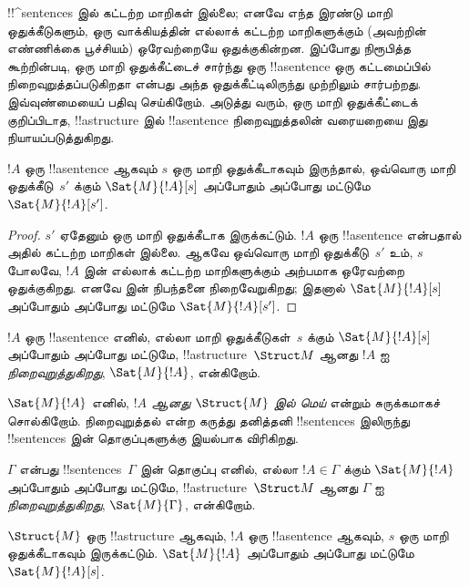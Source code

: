 \documentclass[../../../include/open-logic-section]{subfiles}
\begin{document}
\begin{explain}
!!^{sentence}s இல் கட்டற்ற மாறிகள் இல்லை; எனவே எந்த இரண்டு மாறி
ஒதுக்கீடுகளும், ஒரு வாக்கியத்தின் எல்லாக் கட்டற்ற மாறிகளுக்கும்
(அவற்றின் எண்ணிக்கை பூச்சியம்) ஒரேவற்றையே ஒதுக்குகின்றன.
இப்போது நிரூபித்த கூற்றின்படி, ஒரு மாறி ஒதுக்கீட்டைச் சார்ந்து ஒரு
!!a{sentence} ஒரு கட்டமைப்பில் நிறைவுறுத்தப்படுகிறதா என்பது அந்த
ஒதுக்கீட்டிலிருந்து முற்றிலும் சார்பற்றது. இவ்வுண்மையைப் பதிவு
செய்கிறோம். அடுத்து வரும், ஒரு மாறி ஒதுக்கீட்டைக் குறிப்பிடாத,
!!a{structure} இல் !!a{sentence} நிறைவுறுத்தலின் வரையறையை இது
நியாயப்படுத்துகிறது.
\end{explain}

\begin{cor}
$!A$ ஒரு !!a{sentence} ஆகவும் $s$ ஒரு மாறி ஒதுக்கீடாகவும் இருந்தால்,
ஒவ்வொரு மாறி ஒதுக்கீடு~$s'$ க்கும் $\Sat{M}{!A}[s]$ அப்போதும் அப்போது மட்டுமே
$\Sat{M}{!A}[s']$.
\end{cor}

\begin{proof}
  $s'$ ஏதேனும் ஒரு மாறி ஒதுக்கீடாக இருக்கட்டும். $!A$ ஒரு
  !!a{sentence} என்பதால் அதில் கட்டற்ற மாறிகள் இல்லை. ஆகவே ஒவ்வொரு
  மாறி ஒதுக்கீடு~$s'$ உம், $s$ போலவே, $!A$ இன் எல்லாக் கட்டற்ற
  மாறிகளுக்கும் அற்பமாக ஒரேவற்றை ஒதுக்குகிறது. எனவே
   இன் நிபந்தனை நிறைவேறுகிறது; இதனால்
  $\Sat{M}{!A}[s]$ அப்போதும் அப்போது மட்டுமே $\Sat{M}{!A}[s']$.
\end{proof}

\begin{defn}
$!A$ ஒரு !!a{sentence} எனில், எல்லா மாறி ஒதுக்கீடுகள்~$s$ க்கும்
$\Sat{M}{!A}[s]$ அப்போதும் அப்போது மட்டுமே, !!a{structure}~$\Struct M$ ஆனது $!A$ ஐ
\emph{நிறைவுறுத்துகிறது}, $\Sat{M}{!A}$, என்கிறோம்.
\end{defn}

$\Sat{M}{!A}$ எனில், \emph{$!A$ ஆனது $\Struct{M}$ இல் மெய்} என்றும்
சுருக்கமாகச் சொல்கிறோம். நிறைவுறுத்தல் என்ற கருத்து தனித்தனி
!!{sentence}s இலிருந்து !!{sentence}s இன் தொகுப்புகளுக்கு இயல்பாக
விரிகிறது.

\begin{defn}
$\Gamma$ என்பது !!{sentence}s~$\Gamma$ இன் தொகுப்பு எனில், எல்லா
$!A \in \Gamma$ க்கும் $\Sat{M}{!A}$ அப்போதும் அப்போது மட்டுமே, !!a{structure}~$\Struct M$
ஆனது $\Gamma$ ஐ \emph{நிறைவுறுத்துகிறது}, $\Sat{M}{\Gamma}$, என்கிறோம்.
\end{defn}

\begin{prop}
  $\Struct{M}$ ஒரு !!a{structure} ஆகவும், $!A$ ஒரு !!a{sentence}
  ஆகவும், $s$ ஒரு மாறி ஒதுக்கீடாகவும் இருக்கட்டும்.
  $\Sat{M}{!A}$ அப்போதும் அப்போது மட்டுமே $\Sat{M}{!A}[s]$.
\end{prop}
\end{document}
